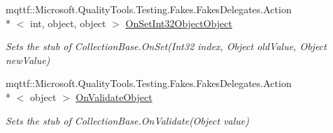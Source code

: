\begin{DoxyCompactItemize}
mqttf\-::\-Microsoft.\-Quality\-Tools.\-Testing.\-Fakes.\-Fakes\-Delegates.\-Action\\*
$<$ int, object, object $>$ \hyperlink{class_system_1_1_security_1_1_cryptography_1_1_x509_certificates_1_1_fakes_1_1_stub_x509_certificate_collection_a7a2b38e975f09ab9f6a3968e4dedb807}{On\-Set\-Int32\-Object\-Object}
\begin{DoxyCompactList}\small\item\em Sets the stub of Collection\-Base.\-On\-Set(\-Int32 index, Object old\-Value, Object new\-Value)\end{DoxyCompactList}\item 
mqttf\-::\-Microsoft.\-Quality\-Tools.\-Testing.\-Fakes.\-Fakes\-Delegates.\-Action\\*
$<$ object $>$ \hyperlink{class_system_1_1_security_1_1_cryptography_1_1_x509_certificates_1_1_fakes_1_1_stub_x509_certificate_collection_a9741764c7d589e19a953adef02123e79}{On\-Validate\-Object}
\begin{DoxyCompactList}\small\item\em Sets the stub of Collection\-Base.\-On\-Validate(\-Object value)\end{DoxyCompactList}\end{DoxyCompactItemize}
